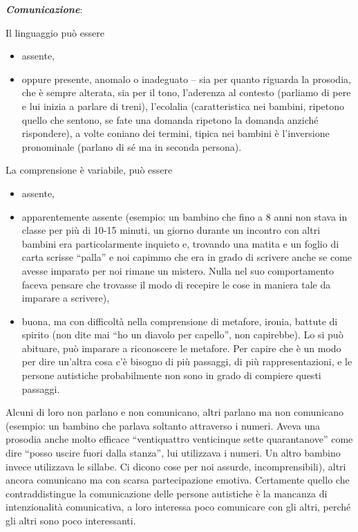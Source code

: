 \documentclass[]{article}
\begin{document}
\emph{\textbf{Comunicazione}}:

Il linguaggio può essere

\begin{itemize}
\item
  assente,
\item
  oppure presente, anomalo o inadeguato -- sia per quanto riguarda la
  prosodia, che è sempre alterata, sia per il tono, l'aderenza al
  contesto (parliamo di pere e lui inizia a parlare di treni),
  l'ecolalia (caratteristica nei bambini, ripetono quello che sentono,
  se fate una domanda ripetono la domanda anziché rispondere), a volte
  coniano dei termini, tipica nei bambini è l'inversione pronominale
  (parlano di sé ma in seconda persona).
\end{itemize}

La comprensione è variabile, può essere

\begin{itemize}
\item
  assente,
\item
  apparentemente assente (esempio: un bambino che fino a 8 anni non
  stava in classe per più di 10-15 minuti, un giorno durante un incontro
  con altri bambini era particolarmente inquieto e, trovando una matita
  e un foglio di carta scrisse ``palla'' e noi capimmo che era in grado
  di scrivere anche se come avesse imparato per noi rimane un mistero.
  Nulla nel suo comportamento faceva pensare che trovasse il modo di
  recepire le cose in maniera tale da imparare a scrivere),
\item
  buona, ma con difficoltà nella comprensione di metafore, ironia,
  battute di spirito (non dite mai ``ho un diavolo per capello'', non
  capirebbe). Lo si può abituare, può imparare a riconoscere le
  metafore. Per capire che è un modo per dire un'altra cosa c'è bisogno
  di più passaggi, di più rappresentazioni, e le persone autistiche
  probabilmente non sono in grado di compiere questi passaggi.
\end{itemize}

Alcuni di loro non parlano e non comunicano, altri parlano ma non
comunicano (esempio: un bambino che parlava soltanto attraverso i
numeri. Aveva una prosodia anche molto efficace ``ventiquattro
venticinque sette quarantanove'' come dire ``posso uscire fuori dalla
stanza'', lui utilizzava i numeri. Un altro bambino invece utilizzava le
sillabe. Ci dicono cose per noi assurde, incomprensibili), altri ancora
comunicano ma con scarsa partecipazione emotiva. Certamente quello che
contraddistingue la comunicazione delle persone autistiche è la mancanza
di intenzionalità comunicativa, a loro interessa poco comunicare con gli
altri, perché gli altri sono poco interessanti.
\end{document}
